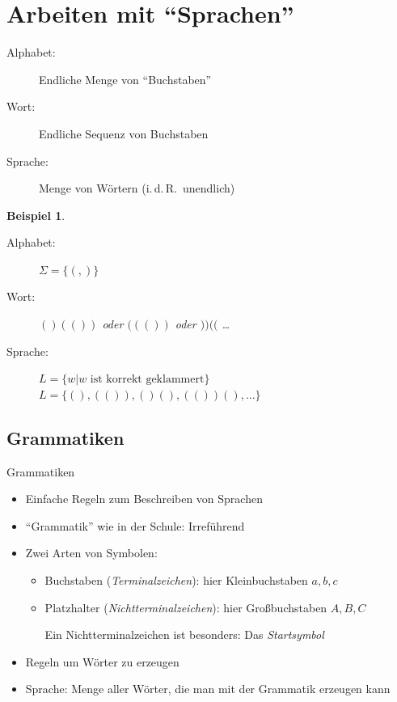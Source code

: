 \documentclass{beamer}
\theoremstyle{example}
\newtheorem{ex}{Beispiel}
\renewenvironment{example}{\begin{ex}}{\end{ex}}
\begin{document}
\section{Arbeiten mit ``Sprachen''}
\begin{frame}
  \begin{definition}
    \begin{description}
    \item[Alphabet:] Endliche Menge von ``Buchstaben''
    \item[Wort:] Endliche Sequenz von Buchstaben
    \item[Sprache:] Menge von Wörtern (i.\,d.\,R.\ unendlich)
    \end{description}
  \end{definition}
  \begin{example}
    \begin{description}
    \item[Alphabet:] $\Sigma = \{ (,)\}$
    \item[Wort:] $()(())$ oder $((())$ oder $))(($ \ldots
    \item[Sprache:] $L=\{w | \text{$w$ ist korrekt geklammert}\}$
      $L = \{(),(()),()(),(())(),\ldots\}$
    \end{description}
  \end{example}
\end{frame}

\subsection{Grammatiken}
\begin{frame}{Grammatiken}
  \begin{itemize}
  \item Einfache Regeln zum Beschreiben von Sprachen
  \item ``Grammatik'' wie in der Schule: Irreführend
  \item Zwei Arten von Symbolen:
    \begin{itemize}
    \item Buchstaben (\emph{Terminalzeichen}): hier Kleinbuchstaben $a,b,c$
    \item Platzhalter (\emph{Nichtterminalzeichen}): hier Großbuchstaben $A,B,C$

      Ein Nichtterminalzeichen ist besonders: Das \emph{Startsymbol}
    \end{itemize}
  \item Regeln um Wörter zu erzeugen
  \item Sprache: Menge aller Wörter, die man mit der Grammatik erzeugen kann
  \end{itemize}
\end{frame}
\end{document}
